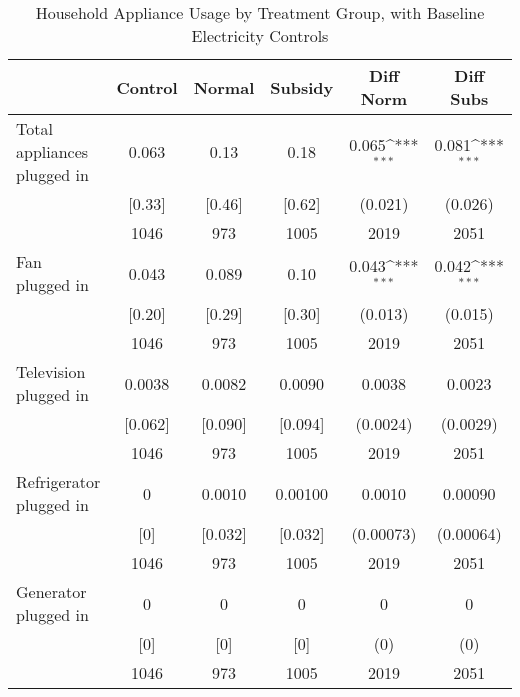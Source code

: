 \begin{table}[htbp]\centering
\def\sym#1{\ifmmode^{#1}\else\(^{#1}\)\fi}
\caption{Household Appliance Usage by Treatment Group, with Baseline Electricity Controls \label{tab:"balance"}}
\begin{tabular*}{0.9\hsize}{@{\hskip\tabcolsep\extracolsep\fill}l*{1}{ccccc}}
\toprule
                                &  Control&   Normal&  Subsidy&Diff Norm         &Diff Subs         \\
\midrule
Total appliances plugged in     &    0.063&     0.13&     0.18&    0.065\sym{***}&    0.081\sym{***}\\
                                &   [0.33]&   [0.46]&   [0.62]&  (0.021)         &  (0.026)         \\
                                &     1046&      973&     1005&     2019         &     2051         \\
Fan plugged in                  &    0.043&    0.089&     0.10&    0.043\sym{***}&    0.042\sym{***}\\
                                &   [0.20]&   [0.29]&   [0.30]&  (0.013)         &  (0.015)         \\
                                &     1046&      973&     1005&     2019         &     2051         \\
Television plugged in           &   0.0038&   0.0082&   0.0090&   0.0038         &   0.0023         \\
                                &  [0.062]&  [0.090]&  [0.094]& (0.0024)         & (0.0029)         \\
                                &     1046&      973&     1005&     2019         &     2051         \\
Refrigerator plugged in         &        0&   0.0010&  0.00100&   0.0010         &  0.00090         \\
                                &      [0]&  [0.032]&  [0.032]&(0.00073)         &(0.00064)         \\
                                &     1046&      973&     1005&     2019         &     2051         \\
Generator plugged in            &        0&        0&        0&        0         &        0         \\
                                &      [0]&      [0]&      [0]&      (0)         &      (0)         \\
                                &     1046&      973&     1005&     2019         &     2051         \\

\end{tabular*}
\end{table}
